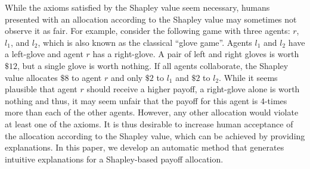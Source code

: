 \documentclass[letterpaper]{article} %
\begin{document}
While the axioms satisfied by the Shapley value seem necessary, humans presented with an allocation according to the Shapley value may sometimes not observe it as fair. For example, consider the following game with three agents: $r$, $l_1$, and $l_2$, which is also known as the classical ``glove game''. Agents $l_1$ and $l_2$ have a left-glove and agent $r$ has a right-glove. A pair of left and right gloves is worth $\$12$, but a single glove is worth nothing. If all agents collaborate, the Shapley value allocates $\$8$ to agent $r$ and only $\$2$ to $l_1$ and $\$2$ to $l_2$. While it seems plausible that agent $r$ should receive a higher payoff, a right-glove alone is worth nothing and thus, it may seem unfair that the payoff for this agent is $4$-times more than each of the other agents. However, any other allocation would violate at least one of the axioms. It is thus desirable to increase human acceptance of the allocation according to the Shapley value, which can be achieved by providing explanations.
In this paper, we develop an automatic method that generates intuitive explanations for a Shapley-based payoff allocation.

\end{document}
